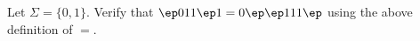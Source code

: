 Let $\Sigma = \{0,1\}$. Verify that $\ep 011 \ep 1 = 0 \ep\ep 111
\ep$ using the above definition of $=$.
